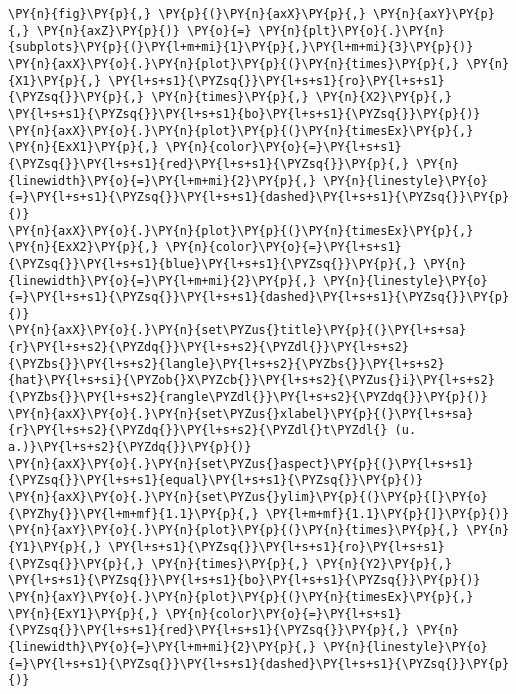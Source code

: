     \begin{tcolorbox}[breakable, size=fbox, boxrule=1pt, pad at break*=1mm,colback=cellbackground, colframe=cellborder]
\begin{Verbatim}[commandchars=\\\{\}]
\PY{n}{fig}\PY{p}{,} \PY{p}{(}\PY{n}{axX}\PY{p}{,} \PY{n}{axY}\PY{p}{,} \PY{n}{axZ}\PY{p}{)} \PY{o}{=} \PY{n}{plt}\PY{o}{.}\PY{n}{subplots}\PY{p}{(}\PY{l+m+mi}{1}\PY{p}{,}\PY{l+m+mi}{3}\PY{p}{)}
\PY{n}{axX}\PY{o}{.}\PY{n}{plot}\PY{p}{(}\PY{n}{times}\PY{p}{,} \PY{n}{X1}\PY{p}{,} \PY{l+s+s1}{\PYZsq{}}\PY{l+s+s1}{ro}\PY{l+s+s1}{\PYZsq{}}\PY{p}{,} \PY{n}{times}\PY{p}{,} \PY{n}{X2}\PY{p}{,} \PY{l+s+s1}{\PYZsq{}}\PY{l+s+s1}{bo}\PY{l+s+s1}{\PYZsq{}}\PY{p}{)}
\PY{n}{axX}\PY{o}{.}\PY{n}{plot}\PY{p}{(}\PY{n}{timesEx}\PY{p}{,} \PY{n}{ExX1}\PY{p}{,} \PY{n}{color}\PY{o}{=}\PY{l+s+s1}{\PYZsq{}}\PY{l+s+s1}{red}\PY{l+s+s1}{\PYZsq{}}\PY{p}{,} \PY{n}{linewidth}\PY{o}{=}\PY{l+m+mi}{2}\PY{p}{,} \PY{n}{linestyle}\PY{o}{=}\PY{l+s+s1}{\PYZsq{}}\PY{l+s+s1}{dashed}\PY{l+s+s1}{\PYZsq{}}\PY{p}{)}
\PY{n}{axX}\PY{o}{.}\PY{n}{plot}\PY{p}{(}\PY{n}{timesEx}\PY{p}{,} \PY{n}{ExX2}\PY{p}{,} \PY{n}{color}\PY{o}{=}\PY{l+s+s1}{\PYZsq{}}\PY{l+s+s1}{blue}\PY{l+s+s1}{\PYZsq{}}\PY{p}{,} \PY{n}{linewidth}\PY{o}{=}\PY{l+m+mi}{2}\PY{p}{,} \PY{n}{linestyle}\PY{o}{=}\PY{l+s+s1}{\PYZsq{}}\PY{l+s+s1}{dashed}\PY{l+s+s1}{\PYZsq{}}\PY{p}{)}
\PY{n}{axX}\PY{o}{.}\PY{n}{set\PYZus{}title}\PY{p}{(}\PY{l+s+sa}{r}\PY{l+s+s2}{\PYZdq{}}\PY{l+s+s2}{\PYZdl{}}\PY{l+s+s2}{\PYZbs{}}\PY{l+s+s2}{langle}\PY{l+s+s2}{\PYZbs{}}\PY{l+s+s2}{hat}\PY{l+s+si}{\PYZob{}X\PYZcb{}}\PY{l+s+s2}{\PYZus{}i}\PY{l+s+s2}{\PYZbs{}}\PY{l+s+s2}{rangle\PYZdl{}}\PY{l+s+s2}{\PYZdq{}}\PY{p}{)}
\PY{n}{axX}\PY{o}{.}\PY{n}{set\PYZus{}xlabel}\PY{p}{(}\PY{l+s+sa}{r}\PY{l+s+s2}{\PYZdq{}}\PY{l+s+s2}{\PYZdl{}t\PYZdl{} (u. a.)}\PY{l+s+s2}{\PYZdq{}}\PY{p}{)}
\PY{n}{axX}\PY{o}{.}\PY{n}{set\PYZus{}aspect}\PY{p}{(}\PY{l+s+s1}{\PYZsq{}}\PY{l+s+s1}{equal}\PY{l+s+s1}{\PYZsq{}}\PY{p}{)}
\PY{n}{axX}\PY{o}{.}\PY{n}{set\PYZus{}ylim}\PY{p}{(}\PY{p}{[}\PY{o}{\PYZhy{}}\PY{l+m+mf}{1.1}\PY{p}{,} \PY{l+m+mf}{1.1}\PY{p}{]}\PY{p}{)}
\PY{n}{axY}\PY{o}{.}\PY{n}{plot}\PY{p}{(}\PY{n}{times}\PY{p}{,} \PY{n}{Y1}\PY{p}{,} \PY{l+s+s1}{\PYZsq{}}\PY{l+s+s1}{ro}\PY{l+s+s1}{\PYZsq{}}\PY{p}{,} \PY{n}{times}\PY{p}{,} \PY{n}{Y2}\PY{p}{,} \PY{l+s+s1}{\PYZsq{}}\PY{l+s+s1}{bo}\PY{l+s+s1}{\PYZsq{}}\PY{p}{)}
\PY{n}{axY}\PY{o}{.}\PY{n}{plot}\PY{p}{(}\PY{n}{timesEx}\PY{p}{,} \PY{n}{ExY1}\PY{p}{,} \PY{n}{color}\PY{o}{=}\PY{l+s+s1}{\PYZsq{}}\PY{l+s+s1}{red}\PY{l+s+s1}{\PYZsq{}}\PY{p}{,} \PY{n}{linewidth}\PY{o}{=}\PY{l+m+mi}{2}\PY{p}{,} \PY{n}{linestyle}\PY{o}{=}\PY{l+s+s1}{\PYZsq{}}\PY{l+s+s1}{dashed}\PY{l+s+s1}{\PYZsq{}}\PY{p}{)}

\end{Verbatim}
\end{tcolorbox}
